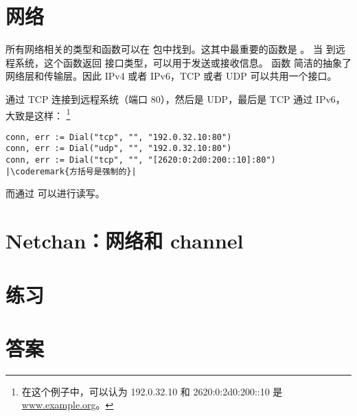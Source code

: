 \section{网络}
所有网络相关的类型和函数可以在  包中找到。这其中最重要的函数是 。
当  到远程系统，这个函数返回  接口类型，可以用于发送或接收信息。
函数  简洁的抽象了网络层和传输层。因此 IPv4 或者 IPv6，TCP 或者 UDP 可以共用一个接口。

通过 TCP 连接到远程系统（端口 80），然后是 UDP，最后是 TCP 通过 IPv6，大致是这样：
\footnote{在这个例子中，可以认为 192.0.32.10 和 2620:0:2d0:200::10 是 \url{www.example.org}。}
\begin{lstlisting}
conn, err := Dial("tcp", "", "192.0.32.10:80")
conn, err := Dial("udp", "", "192.0.32.10:80")
conn, err := Dial("tcp", "", "[2620:0:2d0:200::10]:80") |\coderemark{方括号是强制的}|
\end{lstlisting}

而通过  可以进行读写。


\section{Netchan：网络和 channel}


\section{练习}










\cleardoublepage
\section{答案}
\shipoutAnswer
